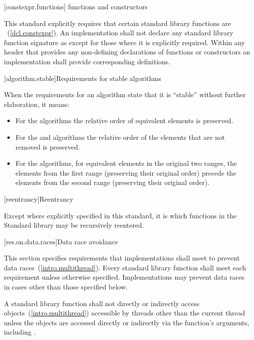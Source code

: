 [constexpr.functions]{ functions and constructors}

\pnum
This standard explicitly requires that certain standard library functions are
~(\ref{dcl.constexpr}). An implementation shall not declare
any standard library function signature as  except for those where
it is explicitly required.
Within any header that provides any non-defining declarations of 
functions or constructors an implementation shall provide corresponding definitions.

[algorithm.stable]{Requirements for stable algorithms}

\pnum
{}%
%
When the requirements for an algorithm state that it is ``stable'' without further elaboration,
it means:

\begin{itemize}
\item For the  algorithms the relative order of equivalent
elements is preserved.

\item For the  and  algorithms the relative order of
the elements that are not removed is preserved.

\item For the  algorithms, for equivalent elements in
the original two ranges, the elements from the first range (preserving their
original order) precede the elements from the second range (preserving their
original order).
\end{itemize}

[reentrancy]{Reentrancy}

\pnum
Except where explicitly specified in this standard, it is  which functions in the Standard \Cpp
library may be recursively reentered.

[res.on.data.races]{Data race avoidance}

\pnum
This section specifies requirements that implementations shall meet to prevent data
races~(\ref{intro.multithread}).
Every standard library function shall meet each requirement unless otherwise specified.
Implementations may prevent data races in cases other than those specified below.

\pnum
A \Cpp standard library function shall not directly or indirectly access
objects~(\ref{intro.multithread}) accessible by threads other than the current thread
unless the objects are accessed directly or indirectly via the function's arguments,
including .

